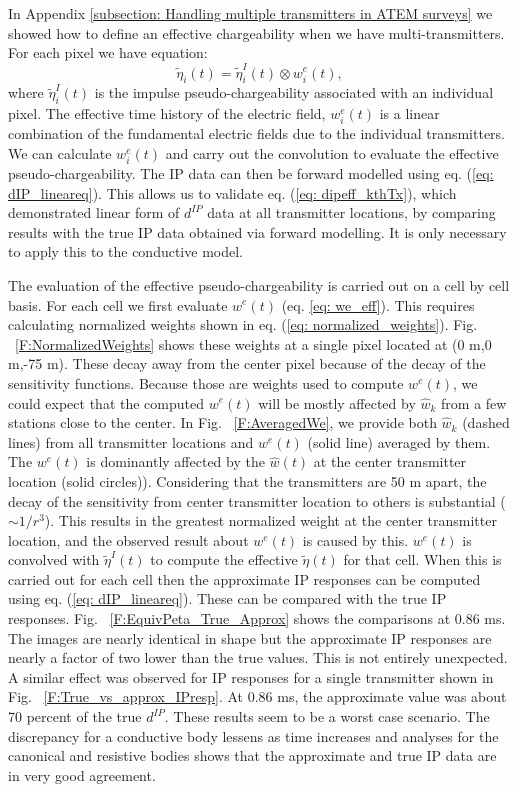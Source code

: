 \documentclass[extra,mreferee]{gji}
\newcommand{\peta}{\tilde{\eta}}
\newcommand{\dip}{d^{IP}}
\begin{document}
In Appendix \ref{subsection: Handling multiple transmitters in ATEM surveys} we showed how to define an effective chargeability when we have multi-transmitters. For each pixel we have
equation:
\begin{equation}
  \peta_i(t) = \peta_i^I(t) \otimes  w_i^e(t),
\end{equation}
where $\peta_i^I(t)$ is the impulse pseudo-chargeability associated with an individual pixel. The effective time history of the electric field, $w_i^e(t)$ is a linear combination of the fundamental electric fields due to the individual transmitters. We can calculate $w_i^e(t)$ and carry out the convolution to evaluate the effective pseudo-chargeability. The IP data can then be forward modelled using eq. (\ref{eq: dIP_lineareq}). This allows us to validate eq. (\ref{eq: dipeff_kthTx}), which demonstrated linear form of $\dip$ data at all transmitter locations, by comparing results with the true IP data obtained via forward modelling.
 It is only necessary to apply this to the conductive model.

The evaluation of the effective pseudo-chargeability is carried out on  a cell by cell basis. For each cell  we  first evaluate $w^e(t)$ (eq. \ref{eq: we_eff}). This requires calculating normalized weights shown in eq. (\ref{eq: normalized_weights}).
Fig. ~\ref{F:NormalizedWeights} shows these weights at a single pixel located at (0 m,0 m,-75 m). These decay away from the center pixel because of the decay of the sensitivity functions.
Because those are weights used to compute $w^e(t)$, we could expect that the computed $w^e(t)$ will be mostly affected by $\hat{w}_k$ from a few stations close to the center. In Fig. ~\ref{F:AveragedWe}, we provide both $\hat{w}_k$ (dashed lines) from all transmitter locations and $w^e(t)$ (solid line) averaged by them. The $w^e(t)$ is dominantly affected by the $\hat{w}(t)$ at the center transmitter location (solid circles)). Considering that the transmitters are 50 m apart, the  decay of the sensitivity from center transmitter location to others is substantial ($\sim 1/r^3$). This results in the greatest normalized weight at the center transmitter location, and the observed result about $w^e(t)$ is caused by this. $w^e(t)$ is convolved  with  $\peta^I(t)$ to compute the effective $\peta(t)$ for that cell. When this is carried out for each cell then the approximate IP responses can be computed using eq. (\ref{eq: dIP_lineareq}). These can be compared with the true IP responses.
Fig. ~\ref{F:EquivPeta_True_Approx} shows the comparisons at 0.86 ms. The images are nearly identical in shape but the approximate IP responses are nearly a factor of two lower than the true values. This is not entirely unexpected. A similar effect was observed for IP responses for a single transmitter shown in Fig. ~\ref{F:True_vs_approx_IPresp}. At 0.86 ms, the approximate value was about 70 percent of the true $\dip$. These results seem to be a worst case scenario. The discrepancy for a conductive body lessens as time increases and analyses for the canonical and resistive bodies shows that the approximate and true IP data are in very good agreement.
\end{document}
